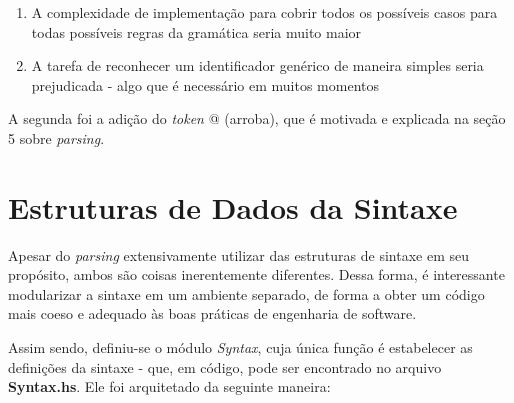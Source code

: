 \documentclass{article}
\begin{document}
\begin{enumerate}
    \item A complexidade de implementação para cobrir todos os possíveis casos para todas possíveis regras da gramática seria muito maior
    \item A tarefa de reconhecer um identificador genérico de maneira simples seria prejudicada - algo que é necessário em muitos momentos
\end{enumerate}

A segunda foi a adição do \textit{token} @ (arroba), que é motivada e explicada na seção 5 sobre \textit{parsing}.

\section{Estruturas de Dados da Sintaxe}
Apesar do \textit{parsing} extensivamente utilizar das estruturas de sintaxe em seu propósito, ambos são coisas inerentemente diferentes. Dessa forma, é interessante modularizar a sintaxe em um ambiente separado, de forma a obter um código mais coeso e adequado às boas práticas de engenharia de software.

Assim sendo, definiu-se o módulo \textit{Syntax}, cuja única função é estabelecer as definições da sintaxe - que, em código, pode ser encontrado no arquivo \textbf{Syntax.hs}. Ele foi arquitetado da seguinte maneira:
\end{document}
